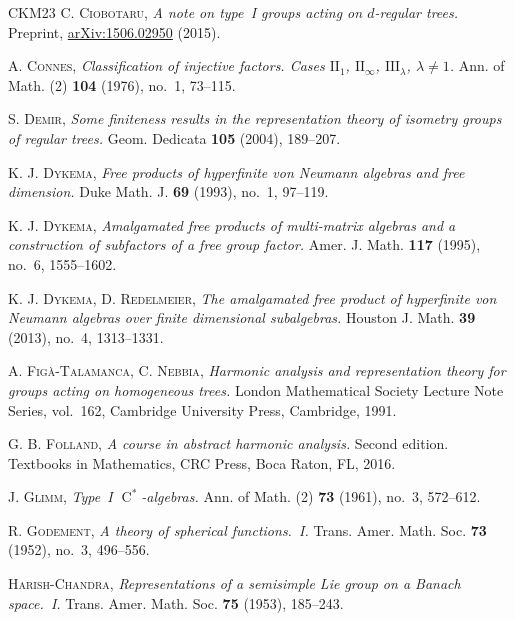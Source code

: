 \documentclass[11pt]{amsart}
\numberwithin{equation}{section}
\newcommand{\Cstar}{\operatorname{C}^*}
\theoremstyle{definition}
\begin{document}
\begin{thebibliography}{CKM23}
     \textsc{C. Ciobotaru}, \textit{A note on type~\textup{I} groups acting on $d$-regular trees.} Preprint, \href{https://arxiv.org/abs/1506.02950}{arXiv:1506.02950} (2015).

     \textsc{A. Connes}, \textit{Classification of injective factors. Cases $\mathrm{II}_1$, $\mathrm{II}_\infty$, $\mathrm{III}_\lambda$, $\lambda\neq1$.} Ann. of Math. (2) \textbf{104} (1976), no.~1, 73--115.


     \textsc{S. Demir}, \textit{Some finiteness results in the representation theory of isometry groups of regular trees.} Geom. Dedicata \textbf{105} (2004), 189--207.

     \textsc{K. J. Dykema}, \textit{Free products of hyperfinite von Neumann algebras and free dimension.} Duke Math. J. \textbf{69} (1993), no.~1, 97--119.

     \textsc{K. J. Dykema}, \textit{Amalgamated free products of multi-matrix algebras and a construction of subfactors of a free group factor.} Amer. J. Math. \textbf{117} (1995), no.~6, 1555--1602.

     \textsc{K. J. Dykema, D. Redelmeier}, \textit{The amalgamated free product of hyperfinite von Neumann algebras over finite dimensional subalgebras.} Houston J. Math. \textbf{39} (2013), no.~4, 1313--1331.

     \textsc{A. Fig\`a-Talamanca, C. Nebbia}, \textit{Harmonic analysis and representation theory for groups acting on homogeneous trees.} London Mathematical Society Lecture Note Series, vol.~162, Cambridge University Press, Cambridge, 1991.

     \textsc{G. B. Folland}, \textit{A course in abstract harmonic analysis.} Second edition. Textbooks in Mathematics, CRC Press, Boca Raton, FL, 2016.

     \textsc{J. Glimm}, \textit{Type~\textup{I} $\Cstar$-algebras.} Ann. of Math. (2) \textbf{73} (1961), no.~3, 572--612.

     \textsc{R. Godement}, \textit{A theory of spherical functions.~\textup{I}.} Trans. Amer. Math. Soc. \textbf{73} (1952), no.~3, 496--556.

     \textsc{Harish-Chandra}, \textit{Representations of a semisimple Lie group on a Banach space.~\textup{I}.} Trans. Amer. Math. Soc. \textbf{75} (1953), 185--243.


\end{thebibliography}
\end{document}
